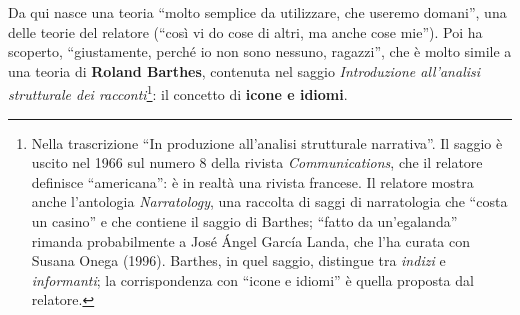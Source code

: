 Da qui nasce una teoria ``molto semplice da utilizzare, che useremo domani'',
una delle teorie del relatore (``così vi do cose di altri, ma anche cose mie'').
Poi ha scoperto, ``giustamente, perché io non sono nessuno, ragazzi'', che è
molto simile a una teoria di \textbf{Roland Barthes}, contenuta nel saggio
\emph{Introduzione all'analisi strutturale dei racconti}\footnote{Nella
trascrizione ``In produzione all'analisi strutturale narrativa''. Il saggio è
uscito nel 1966 sul numero 8 della rivista \emph{Communications}, che il
relatore definisce ``americana'': è in realtà una rivista francese. Il relatore
mostra anche l'antologia \emph{Narratology}, una raccolta di saggi di
narratologia che ``costa un casino'' e che contiene il saggio di Barthes;
``fatto da un'egalanda'' rimanda probabilmente a José Ángel García Landa, che
l'ha curata con Susana Onega (1996). Barthes, in quel saggio, distingue tra
\emph{indizi} e \emph{informanti}; la corrispondenza con ``icone e idiomi'' è
quella proposta dal relatore.}: il concetto di \textbf{icone e idiomi}.


